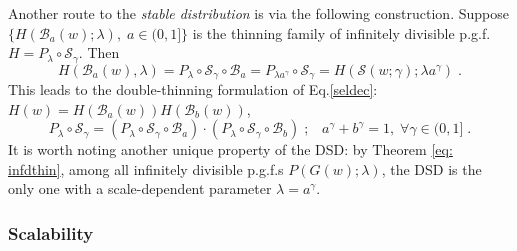 \documentclass[a4paper,12pt]{amsart}
\newcommand{\Z}{\mathbb{Z}_{+}}
\theoremstyle{definition}
\theoremstyle{remark}
\begin{document}
Another route to the {\it stable distribution} is via the following construction.
Suppose $\{ H(\mathcal{B}_a(w); \lambda),\; a\in (0,1]\}$ is the thinning family of infinitely divisible p.g.f.  $H=P_{\lambda}\circ\mathcal{S}_{\gamma}$. Then
\begin{equation}\label{eq: dsdthin}
H(\mathcal{B}_a(w),\lambda)=P_{\lambda}\circ\mathcal{S}_{\gamma} \circ \mathcal{B}_a = P_{\lambda a^{\gamma}}\circ \mathcal{S}_{\gamma}= H(\mathcal{S}(w;\gamma);\lambda a^{\gamma})\;.  
\end{equation}
This leads to the double-thinning formulation of Eq.\ref{seldec}: 
$H(w)= H(\mathcal{B}_{a}(w)) H(\mathcal{B}_{b}(w))$,  
\begin{equation}\label{eq: dsdpgf}
P_{\lambda}\circ \mathcal{S}_{\gamma} = (P_{\lambda}\circ\mathcal{S}_{\gamma} \circ \mathcal{B}_a) \cdot (P_{\lambda}\circ\mathcal{S}_{\gamma} \circ \mathcal{B}_b)\;;\;\;\; a^{\gamma}+b^{\gamma}=1, \;\forall \gamma \in(0,1]\;.
\end{equation}
It is worth noting another unique property of the DSD: by Theorem \ref{eq: infdthin}, among all infinitely divisible p.g.f.{}s $P(G(w);\lambda)$, the DSD is the only one with a scale-dependent parameter $\lambda=a^\gamma$.

\subsubsection{Scalability}\label{scalsub}

\end{document}
